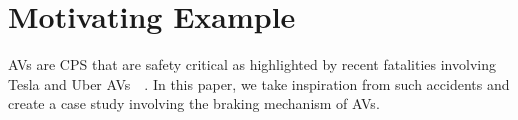 \section{Motivating Example}
\label{sec:av-casestudy}

\acfp{AV} are \acf{CPS} that are safety critical as highlighted by
recent fatalities involving Tesla and Uber \acp{AV}~\cite{coldewey_2018}~\cite{stewart_2018}.
In this paper, we take inspiration from such accidents and create a case study involving the braking mechanism of \acp{AV}.

